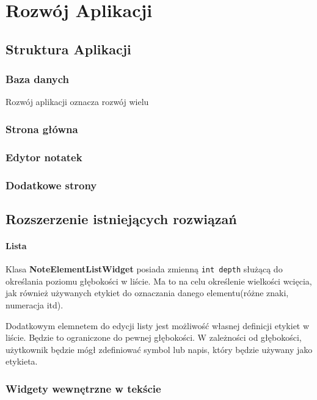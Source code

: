

\chapter{Rozwój Aplikacji}
\label{ch:rozwoj}

\section{Struktura Aplikacji}

\subsection{Baza danych}

Rozwój aplikacji oznacza rozwój wielu 

\subsection{Strona główna}

\subsection{Edytor notatek}

\subsection{Dodatkowe strony}

\section{Rozszerzenie istniejących rozwiązań}

\subsubsection{Lista}

Klasa \textbf{NoteElementListWidget} posiada zmienną \verb|int depth| służącą do określania poziomu głębokości w liście. Ma to na celu określenie wielkości wcięcia, jak również używanych etykiet do oznaczania danego elementu(różne znaki, numeracja itd).

Dodatkowym elemnetem do edycji listy jest możliwość własnej definicji etykiet w liście. Będzie to ograniczone do pewnej głębokości. W zależności od głębokości, użytkownik będzie mógł zdefiniować symbol lub napis, który będzie używany jako etykieta.

\subsection{Widgety wewnętrzne w tekście}

